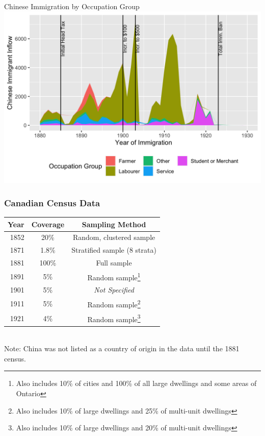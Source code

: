\documentclass[pdf]{beamer}
\renewcommand{\arraystretch}{1.5}
\begin{document}
\begin{frame}{Chinese Immigration by Occupation Group}
    \includegraphics[width = \textwidth]{../../figs/chiocc.png}
\end{frame}

\appendix
\renewcommand{\arraystretch}{1}
\begin{frame}[label = cancensus]
    \frametitle{Canadian Census Data}
    \centering
    \begin{tabular}{|r||c|c|}
        \hline 
        Year & Coverage & Sampling Method \\
        \hline 
        1852 & 20\% & Random, clustered sample \\
        1871 & 1.8\% & Stratified sample (8 strata)\\
        1881 & 100\% & Full sample \\
        1891 & 5\% & Random sample\footnote{Also includes 10\% of cities and 100\% of all large dwellings and some areas of Ontario} \\
        1901 & 5\% & \textit{Not Specified} \\
        1911 & 5\% & Random sample\footnote{Also includes 10\% of large dwellings and 25\% of multi-unit dwellings} \\
        1921 & 4\% & Random sample\footnote{Also includes 10\% of large dwellings and 20\% of multi-unit dwellings} \\
        \hline
    \end{tabular} \\
    Note: China was not listed as a country of origin in the data until the 1881 census.
    \hyperlink{datasources}{}
\end{frame}
\end{document}

